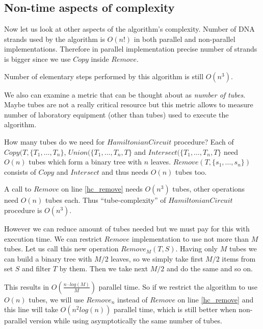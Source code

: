 \subsection{Non-time aspects of complexity}
Now let us look at other aspects of the algorithm's complexity. Number of DNA strands used by the algorithm is $O(n!)$ in both parallel and non-parallel implementations. Therefore in parallel implementation precise number of strands is bigger since we use $Copy$ inside $Remove$.

Number of elementary steps performed by this algorithm is still $O(n^3)$.

We also can examine a metric that can be thought about as \emph{number of tubes}. Maybe tubes are not a really critical resource but this metric allows to measure number of laboratory equipment (other than tubes) used to execute the algorithm. 

How many tubes do we need for $HamiltonianCircuit$ procedure? Each of $Copy(T, \{T_1, \dots, T_n\}$, $Union(\{T_1, \dots, T_n, T\}$ and $Intersect(\{T_1, \dots, T_n, T\}$ need $O(n)$ tubes which form a binary tree with $n$ leaves. $Remove(T, \{s_1, \dots, s_n\})$ consists of $Copy$ and $Intersect$ and thus needs $O(n)$ tubes too.

A call to $Remove$ on line \ref{hc_remove} needs $O(n^3)$ tubes, other operations need $O(n)$ tubes each. Thus ``tube-complexity'' of $HamiltonianCircuit$ procedure is $O(n^3)$. 

However we can reduce amount of tubes needed but we must pay for this with execution time. We can restrict $Remove$ implementation to use not more than $M$ tubes. Let us call this new operation $Remove_M(T, S)$. Having only $M$ tubes we can build a binary tree with $M/2$ leaves, so we simply take first $M/2$ items from set $S$ and filter $T$ by them. Then we take next $M/2$ and do the same and so on.


This results in $O\left(\frac{n \cdot log(M)}{M}\right)$ parallel time. So if we restrict the algorithm to use $O(n)$ tubes, we will use $Remove_n$ instead of $Remove$ on line \ref{hc_remove} and this line will take $O( n^2 log(n))$ parallel time, which is still better when non-parallel version while using asymptotically the same number of tubes.